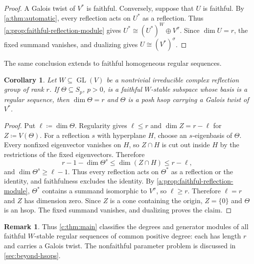 \documentclass[10pt,a4paper]{amsart}
\newcommand{\defeq}{\coloneqq}
\newtheorem{corollary}[theorem]{Corollary}
\theoremstyle{definition}
\newtheorem{remark}[theorem]{Remark}
\begin{document}
\faithfulhsoplemma*

\begin{proof}
A Galois twist of $V^*$ is faithful. Conversely, suppose that $U$ is
faithful. By \cref{a:thm:automatic}, every reflection acts on $U^*$ as a
reflection. Thus \cref{a:prop:faithful-reflection-module} gives
$U^*\cong (U^*)^W\oplus V^\sigma$. Since $\dim U=r$, the fixed
summand vanishes, and dualizing gives $U\cong(V^*)^\sigma$.
\end{proof}

The same conclusion extends to faithful homogeneous regular sequences.
\begin{corollary}\label{a:cor:faithful-partial-sequence}
Let $W\subseteq\operatorname{GL}(V)$ be a nontrivial irreducible complex
reflection group of rank $r$. If $\Theta\subseteq S_p$, $p>0$, is a
faithful $W$-stable subspace whose basis is a regular sequence, then
$\dim\Theta=r$ and $\Theta$ is a posh hsop carrying a Galois
twist of $V^*$.
\end{corollary}
\begin{proof}
Put $\ell\defeq\dim\Theta$. Regularity gives $\ell\le r$ and
$\dim Z=r-\ell$ for $Z\defeq V(\Theta)$. For a reflection $s$
with hyperplane $H$, choose an
$s$-eigenbasis of $\Theta$. Every nonfixed eigenvector vanishes on $H$, so
$Z\cap H$ is cut out inside $H$ by the restrictions of the fixed
eigenvectors. Therefore
\[
 r-1-\dim\Theta^s\leq\dim(Z\cap H)\leq r-\ell,
\]
and $\dim\Theta^s\geq\ell-1$. Thus every reflection acts on $\Theta^*$ as a reflection or
the identity, and faithfulness excludes the identity. By
\cref{a:prop:faithful-reflection-module}, $\Theta^*$ contains a summand
isomorphic to $V^\sigma$, so $\ell\geq r$. Therefore $\ell=r$ and $Z$
has dimension zero. Since $Z$ is a cone containing the origin,
$Z=\{0\}$ and $\Theta$ is an hsop. The fixed summand vanishes, and
dualizing proves the claim.
\end{proof}

\begin{remark}\label{rem:faithful-scope}
Thus \cref{c:thm:main} classifies the degrees and generator modules
of all faithful $W$-stable regular sequences of common positive degree:
each has length $r$ and carries a Galois twist.
The nonfaithful parameter problem is discussed in
\cref{sec:beyond-hsops}.
\end{remark}
\end{document}
